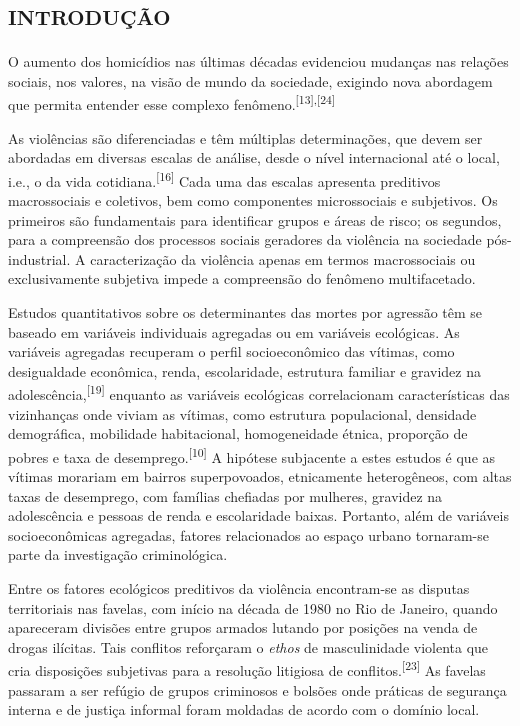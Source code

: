 \documentclass{article}
\begin{document}
\section{\textsc{introdução}}

O aumento dos homicídios nas últimas décadas evidenciou mudanças nas relações
sociais, nos valores, na visão de mundo da sociedade, exigindo nova abordagem
que permita entender esse complexo
fenômeno.\textsuperscript{[}\textsuperscript{13}\textsuperscript{]}\textsuperscript{,}\textsuperscript{[}\textsuperscript{24}\textsuperscript{]}

As violências são diferenciadas e têm múltiplas determinações, que devem ser
abordadas em diversas escalas de análise, desde o nível internacional até o
local, i.e., o da vida cotidiana.\textsuperscript{[}\textsuperscript{16}\textsuperscript{]}
Cada uma das escalas apresenta preditivos macrossociais e coletivos, bem como
componentes microssociais e subjetivos. Os primeiros são fundamentais para
identificar grupos e áreas de risco; os segundos, para a compreensão dos
processos sociais geradores da violência na sociedade pós-industrial. A
caracterização da violência apenas em termos macrossociais ou exclusivamente
subjetiva impede a compreensão do fenômeno multifacetado.

Estudos quantitativos sobre os determinantes das mortes por agressão têm se
baseado em variáveis individuais agregadas ou em variáveis ecológicas. As
variáveis agregadas recuperam o perfil socioeconômico das vítimas, como
desigualdade econômica, renda, escolaridade, estrutura familiar e gravidez na
adolescência,\textsuperscript{[}\textsuperscript{19}\textsuperscript{]}
enquanto as variáveis ecológicas correlacionam características das vizinhanças
onde viviam as vítimas, como estrutura populacional, densidade demográfica,
mobilidade habitacional, homogeneidade étnica, proporção de pobres e taxa de
desemprego.\textsuperscript{[}\textsuperscript{10}\textsuperscript{]}
A hipótese subjacente a estes estudos é que as vítimas morariam em bairros
superpovoados, etnicamente heterogêneos, com altas taxas de desemprego, com
famílias chefiadas por mulheres, gravidez na adolescência e pessoas de renda e
escolaridade baixas. Portanto, além de variáveis socioeconômicas agregadas,
fatores relacionados ao espaço urbano tornaram-se parte da investigação
criminológica.

Entre os fatores ecológicos preditivos da violência encontram-se as disputas
territoriais nas favelas, com início na década de 1980 no Rio de Janeiro, quando
apareceram divisões entre grupos armados lutando por posições na venda de drogas
ilícitas. Tais conflitos reforçaram o \textit{ethos}
de masculinidade violenta que cria disposições subjetivas para a resolução
litigiosa de conflitos.\textsuperscript{[}\textsuperscript{23}\textsuperscript{]}
As favelas passaram a ser refúgio de grupos criminosos e bolsões onde práticas
de segurança interna e de justiça informal foram moldadas de acordo com o
domínio local.
\end{document}
